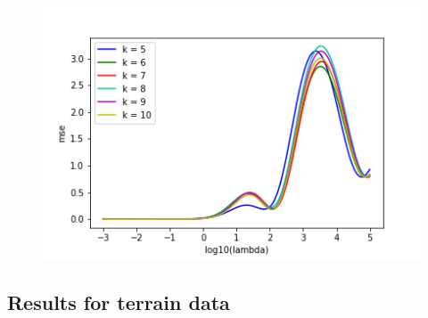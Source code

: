 \begin{figure}[h!]
	\centering
	\includegraphics[width=\textwidth]{Images/Crossval_plot.png}
	\caption{}
	\label{Cross validation itterated over k figure}
\end{figure}

\subsection{Results for terrain data}
